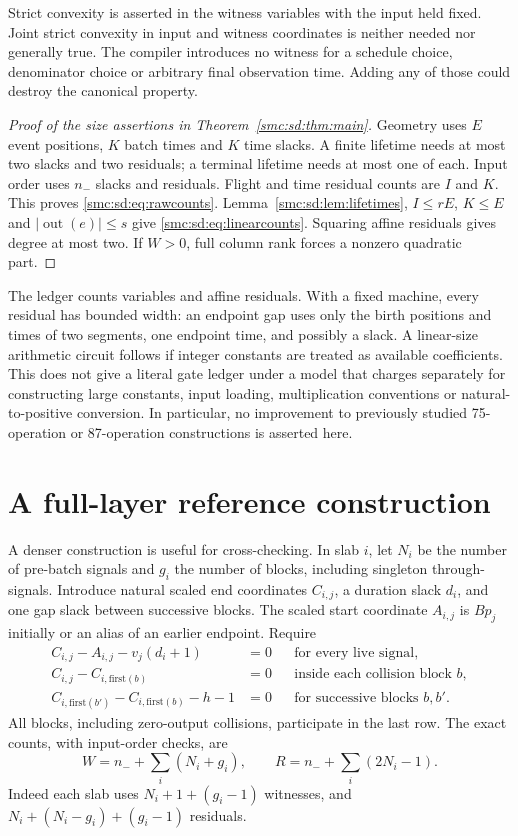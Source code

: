 \documentclass[11pt,letterpaper]{article}
\numberwithin{equation}{section}
\theoremstyle{definition}
\theoremstyle{remark}
\newcommand{\out}{\operatorname{out}}
\newcommand{\nminus}{n_{-}}
\begin{document}
Strict convexity is asserted in the witness variables with the input held fixed. Joint strict convexity in input and witness coordinates is neither needed nor generally true. The compiler introduces no witness for a schedule choice, denominator choice or arbitrary final observation time. Adding any of those could destroy the canonical property.

\begin{proof}[Proof of the size assertions in Theorem~\ref{smc:sd:thm:main}]
Geometry uses $E$ event positions, $K$ batch times and $K$ time slacks. A finite lifetime needs at most two slacks and two residuals; a terminal lifetime needs at most one of each. Input order uses $\nminus$ slacks and residuals. Flight and time residual counts are $I$ and $K$. This proves \eqref{smc:sd:eq:rawcounts}. Lemma~\ref{smc:sd:lem:lifetimes}, $I\le rE$, $K\le E$ and $|\out(e)|\le s$ give \eqref{smc:sd:eq:linearcounts}. Squaring affine residuals gives degree at most two. If $W>0$, full column rank forces a nonzero quadratic part.
\end{proof}

The ledger counts variables and affine residuals. With a fixed machine, every residual has bounded width: an endpoint gap uses only the birth positions and times of two segments, one endpoint time, and possibly a slack. A linear-size arithmetic circuit follows if integer constants are treated as available coefficients. This does not give a literal gate ledger under a model that charges separately for constructing large constants, input loading, multiplication conventions or natural-to-positive conversion. In particular, no improvement to previously studied 75-operation or 87-operation constructions is asserted here.

\section{A full-layer reference construction}\label{smc:sd:sec:fulllayer}
A denser construction is useful for cross-checking. In slab $i$, let $N_i$ be the number of pre-batch signals and $g_i$ the number of blocks, including singleton through-signals. Introduce natural scaled end coordinates $C_{i,j}$, a duration slack $d_i$, and one gap slack between successive blocks. The scaled start coordinate $A_{i,j}$ is $Bp_j$ initially or an alias of an earlier endpoint. Require
\begin{align*}
 C_{i,j}-A_{i,j}-v_j(d_i+1)&=0 &&\text{for every live signal},\\
 C_{i,j}-C_{i,\mathrm{first}(b)}&=0 &&\text{inside each collision block }b,\\
 C_{i,\mathrm{first}(b')}-C_{i,\mathrm{first}(b)}-h-1&=0
 &&\text{for successive blocks }b,b'.
\end{align*}
All blocks, including zero-output collisions, participate in the last row. The exact counts, with input-order checks, are
\begin{equation}\label{smc:sd:eq:baselinecounts}
 W=\nminus+\sum_i(N_i+g_i),\qquad
 R=\nminus+\sum_i(2N_i-1).
\end{equation}
Indeed each slab uses $N_i+1+(g_i-1)$ witnesses, and $N_i+(N_i-g_i)+(g_i-1)$ residuals.
\end{document}
